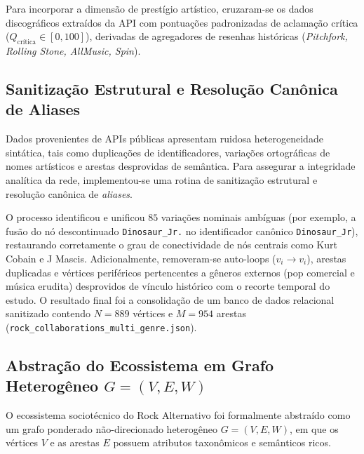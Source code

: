 \documentclass[conference]{IEEEtran}
\begin{document}
Para incorporar a dimensão de prestígio artístico, cruzaram-se os dados discográficos extraídos da API com pontuações padronizadas de aclamação crítica ($Q_{\text{crítica}} \in [0, 100]$), derivadas de agregadores de resenhas históricas (\textit{Pitchfork, Rolling Stone, AllMusic, Spin}).

\subsection{Sanitização Estrutural e Resolução Canônica de Aliases}
Dados provenientes de APIs públicas apresentam ruidosa heterogeneidade sintática, tais como duplicações de identificadores, variações ortográficas de nomes artísticos e arestas desprovidas de semântica. Para assegurar a integridade analítica da rede, implementou-se uma rotina de sanitização estrutural e resolução canônica de \textit{aliases}.

O processo identificou e unificou $85$ variações nominais ambíguas (por exemplo, a fusão do nó descontinuado \texttt{Dinosaur\_Jr.} no identificador canônico \texttt{Dinosaur\_Jr}), restaurando corretamente o grau de conectividade de nós centrais como Kurt Cobain e J Mascis. Adicionalmente, removeram-se auto-loops ($v_i \to v_i$), arestas duplicadas e vértices periféricos pertencentes a gêneros externos (pop comercial e música erudita) desprovidos de vínculo histórico com o recorte temporal do estudo. O resultado final foi a consolidação de um banco de dados relacional sanitizado contendo $N=889$ vértices e $M=954$ arestas (\texttt{rock\_collaborations\_multi\_genre.json}).

\subsection{Abstração do Ecossistema em Grafo Heterogêneo $G=(V,E,W)$}
O ecossistema sociotécnico do Rock Alternativo foi formalmente abstraído como um grafo ponderado não-direcionado heterogêneo $G=(V, E, W)$, em que os vértices $V$ e as arestas $E$ possuem atributos taxonômicos e semânticos ricos.
\end{document}
